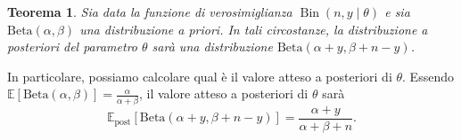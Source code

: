 \documentclass[
  11pt,
  italian,
  a4paper,
  extrafontsizes,onecolumn,openright
  ]{memoir}
\DeclareMathOperator{\Bin}{Bin} %
\newcommand{\E}{\mathbb{E}} %
\newtheorem{theorem}{Teorema}[chapter]
\theoremstyle{definition}
\theoremstyle{definition}
\theoremstyle{definition}
\theoremstyle{definition}
\theoremstyle{remark}
\begin{document}
\begin{theorem}
\protect\hypertarget{thm:beta-binom}{}\label{thm:beta-binom}Sia data la funzione di verosimiglianza \(\Bin(n, y \mid \theta)\) e sia \(\mathrm{Beta}(\alpha, \beta)\) una distribuzione a priori. In tali circostanze, la distribuzione a posteriori del parametro \(\theta\) sarà una distribuzione \(\mathrm{Beta}(\alpha + y, \beta + n - y)\).
\end{theorem}

\noindent
In particolare, possiamo calcolare qual è il valore atteso a posteriori di \(\theta\). Essendo \(\E[\text{Beta}(\alpha, \beta)] = \frac{\alpha}{\alpha + \beta}\), il valore atteso a posteriori di \(\theta\) sarà
\begin{equation}
\E_{\text{post}} [\mathrm{Beta}(\alpha + y, \beta + n - y)] = \frac{\alpha + y}{\alpha + \beta +n}.
\label{eq:ev-post-beta-bin-1}
\end{equation}
\end{document}
